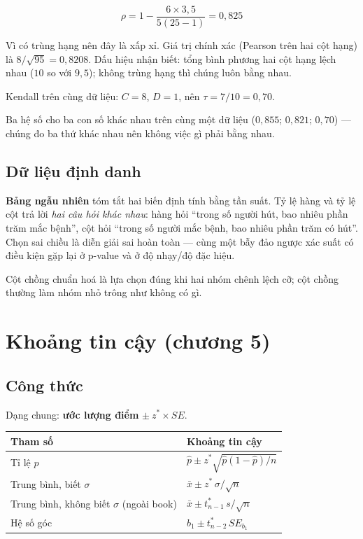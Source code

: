 \documentclass[11pt]{article}
\begin{document}
\[
\rho = 1 - \frac{6 \times 3{,}5}{5(25-1)} = 0{,}825
\]

Vì có trùng hạng nên đây là xấp xỉ. Giá trị chính xác (Pearson trên hai cột hạng)
là $8/\sqrt{95} = 0{,}8208$. Dấu hiệu nhận biết: tổng bình phương hai cột hạng
lệch nhau ($10$ so với $9{,}5$); không trùng hạng thì chúng luôn bằng nhau.

Kendall trên cùng dữ liệu: $C=8$, $D=1$, nên $\tau = 7/10 = 0{,}70$.

Ba hệ số cho ba con số khác nhau trên cùng một dữ liệu ($0{,}855$; $0{,}821$;
$0{,}70$) --- chúng đo ba thứ khác nhau nên không việc gì phải bằng nhau.

\subsection*{Dữ liệu định danh}

\textbf{Bảng ngẫu nhiên} tóm tắt hai biến định tính bằng tần suất. Tỷ lệ hàng và
tỷ lệ cột trả lời \emph{hai câu hỏi khác nhau}: hàng hỏi ``trong số người hút, bao
nhiêu phần trăm mắc bệnh'', cột hỏi ``trong số người mắc bệnh, bao nhiêu phần trăm
có hút''. Chọn sai chiều là diễn giải sai hoàn toàn --- cùng một bẫy đảo ngược xác
suất có điều kiện gặp lại ở p-value và ở độ nhạy/độ đặc hiệu.

Cột chồng chuẩn hoá là lựa chọn đúng khi hai nhóm chênh lệch cỡ; cột chồng thường
làm nhóm nhỏ trông như không có gì.

\section{Khoảng tin cậy (chương 5)}\label{sec:ktc}

\subsection*{Công thức}

Dạng chung: \textbf{ước lượng điểm} $\pm\ z^{*} \times SE$.

\begin{center}
\begin{tabular}{@{}ll@{}}
\toprule
\textbf{Tham số} & \textbf{Khoảng tin cậy} \\
\midrule
Tỉ lệ $p$ & $\hat p \pm z^{*}\sqrt{\hat p(1-\hat p)/n}$ \\[2pt]
Trung bình, biết $\sigma$ & $\bar x \pm z^{*}\,\sigma/\sqrt{n}$ \\[2pt]
Trung bình, không biết $\sigma$ \; (ngoài book) & $\bar x \pm t^{*}_{n-1}\,s/\sqrt{n}$ \\[2pt]
Hệ số góc & $b_1 \pm t^{*}_{n-2}\,SE_{b_1}$ \\
\bottomrule
\end{tabular}
\end{center}
\end{document}
